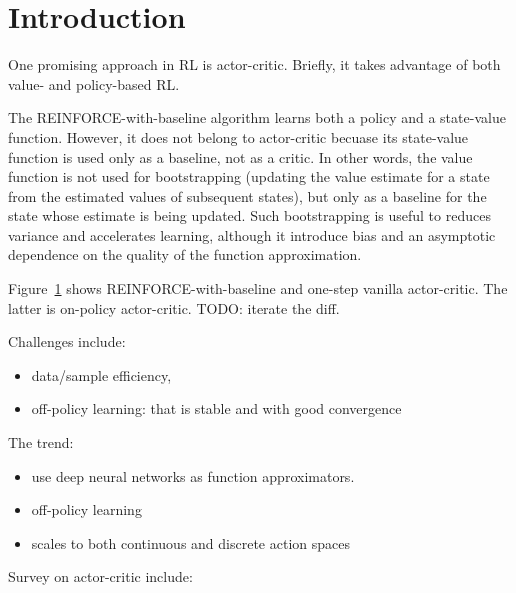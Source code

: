 \section{Introduction}

One promising approach in RL is actor-critic.
Briefly, it takes advantage of both value- and policy-based RL.

The REINFORCE-with-baseline algorithm learns both a policy and a state-value function.
However, it does not belong to actor-critic becuase
its state-value function is used only as a baseline, not as a critic.
In other words, the value function is not used for bootstrapping
(updating the value estimate for a state from the estimated values of subsequent states),
but only as a baseline for the state whose estimate is being updated.
Such bootstrapping is useful to reduces variance and accelerates learning,
although it introduce bias and an asymptotic dependence on
the quality of the function approximation.

Figure~\ref{} shows REINFORCE-with-baseline and one-step vanilla actor-critic.
The latter is on-policy actor-critic.
TODO: iterate the diff.

Challenges include:
\begin{itemize}
\item data/sample efficiency,
\item off-policy learning:
      that is stable and with good convergence
\end{itemize}

The trend:
\begin{itemize}
\item use deep neural networks as function approximators.
\item off-policy learning
\item scales to both continuous and discrete action spaces
\end{itemize}

Survey on actor-critic include:
\cite{6392457, 8103164}
